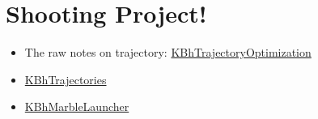 \documentclass[letterpaper]{article}
\begin{document}
\section{Shooting Project!}
\label{sec:org8b09058}
\begin{itemize}
\item The raw notes on trajectory:
\href{KBhTrajectoryOptimization.org}{KBhTrajectoryOptimization}
\item \href{KBhTrajectories.org}{KBhTrajectories}
\item \href{KBhMarbleLauncher.org}{KBhMarbleLauncher}
\end{itemize}
\end{document}
